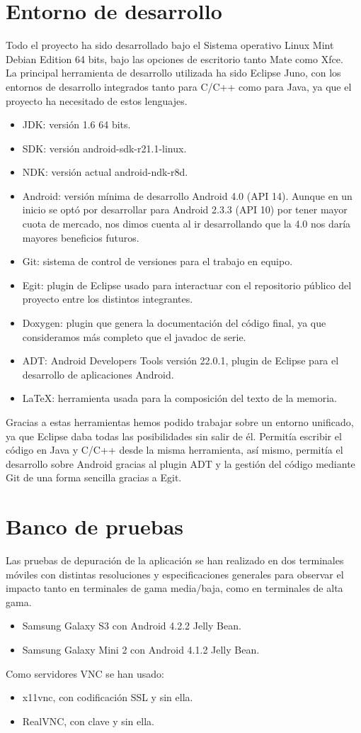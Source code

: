 \section{Entorno de desarrollo}
Todo el proyecto ha sido desarrollado bajo el Sistema operativo Linux Mint Debian Edition 64 bits, bajo las opciones de escritorio tanto Mate como Xfce.\\

La principal herramienta de desarrollo utilizada ha sido Eclipse Juno, con los entornos de desarrollo integrados tanto para C/C++ como para Java, ya que el proyecto ha necesitado de estos lenguajes.
\begin{itemize}
\item JDK: versión 1.6 64 bits.
\item SDK: versión android-sdk-r21.1-linux.
\item NDK: versión actual android-ndk-r8d.
\item Android: versión mínima de desarrollo Android 4.0 (API 14). Aunque en un inicio se optó por desarrollar para Android 2.3.3 (API 10) por tener mayor cuota de mercado, nos dimos cuenta al ir desarrollando que la 4.0 nos daría mayores beneficios futuros.
\item Git: sistema de control de versiones para el trabajo en equipo.
\item Egit: plugin de Eclipse usado para interactuar con el repositorio público del proyecto entre los distintos integrantes.
\item Doxygen: plugin que genera la documentación del código final, ya que consideramos más completo que el javadoc de serie.
\item ADT: Android Developers Tools versión 22.0.1, plugin de Eclipse para el desarrollo de aplicaciones Android.
\item LaTeX: herramienta usada para la composición del texto de la memoria.
\end{itemize}

Gracias a estas herramientas hemos podido trabajar sobre un entorno unificado, ya que Eclipse daba todas las posibilidades sin salir de él. Permitía escribir el código en Java y C/C++ desde la misma herramienta, así mismo, permitía el desarrollo sobre Android gracias al plugin ADT y la gestión del código mediante Git de una forma sencilla gracias a Egit. 



\newpage
\section{Banco de pruebas}
Las pruebas de depuración de la aplicación se han realizado en dos terminales móviles con distintas resoluciones y especificaciones generales para observar el impacto tanto en terminales de gama media/baja, como en terminales de alta gama.
\begin{itemize}
\item Samsung Galaxy S3 con Android 4.2.2 Jelly Bean.
\item Samsung Galaxy Mini 2 con Android 4.1.2 Jelly Bean.
\end{itemize}

Como servidores VNC se han usado:
\begin{itemize}
\item x11vnc, con codificación SSL y sin ella.
\item RealVNC, con clave y sin ella.
\end{itemize}
